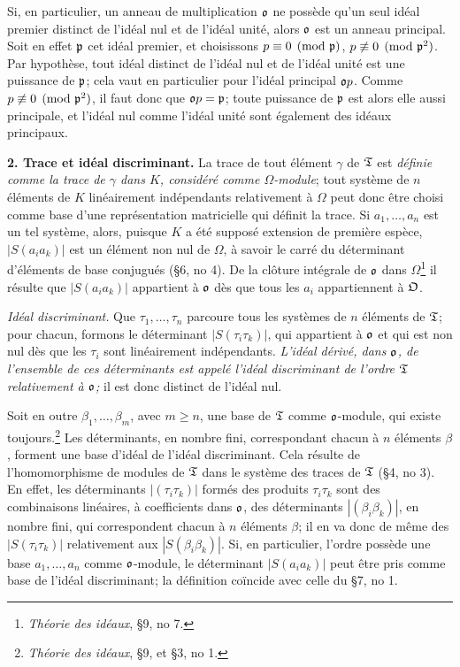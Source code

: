 Si, en particulier, un anneau de multiplication $\mathfrak o$ ne possède qu'un seul idéal premier distinct de l'idéal nul et de l'idéal unité, alors $\mathfrak o$ est un anneau principal. Soit en effet $\mathfrak p$ cet idéal premier, et choisissons $p\equiv0\pmod{\mathfrak p}$, $p\not\equiv0\pmod{\mathfrak p^2}$. Par hypothèse, tout idéal distinct de l'idéal nul et de l'idéal unité est une puissance de $\mathfrak p$; cela vaut en particulier pour l'idéal principal $\mathfrak o p$. Comme $p\not\equiv0\pmod{\mathfrak p^2}$, il faut donc que $\mathfrak o p=\mathfrak p$; toute puissance de $\mathfrak p$ est alors elle aussi principale, et l'idéal nul comme l'idéal unité sont également des idéaux principaux.

\textbf{2. Trace et idéal discriminant.} La trace de tout élément $\gamma$ de $\mathfrak T$ est \emph{définie comme la trace de $\gamma$ dans $K$, considéré comme $\Omega$-module}; tout système de $n$ éléments de $K$ linéairement indépendants relativement à $\Omega$ peut donc être choisi comme base d'une représentation matricielle qui définit la trace. Si $a_1,\ldots,a_n$ est un tel système, alors, puisque $K$ a été supposé extension de première espèce, $|S(a_i a_k)|$ est un élément non nul de $\Omega$, à savoir le carré du déterminant d'éléments de base conjugués (\S 6, no 4). De la clôture intégrale de $\mathfrak o$ dans $\Omega$\footnote{\emph{Théorie des idéaux}, \S 9, no 7.} il résulte que $|S(a_i a_k)|$ appartient à $\mathfrak o$ dès que tous les $a_i$ appartiennent à $\mathfrak O$.

\emph{Idéal discriminant.} Que $\tau_1,\ldots,\tau_n$ parcoure tous les systèmes de $n$ éléments de $\mathfrak T$; pour chacun, formons le déterminant $|S(\tau_i\tau_k)|$, qui appartient à $\mathfrak o$ et qui est non nul dès que les $\tau_i$ sont linéairement indépendants. \emph{L'idéal dérivé, dans $\mathfrak o$, de l'ensemble de ces déterminants est appelé l'idéal discriminant de l'ordre $\mathfrak T$ relativement à $\mathfrak o$;} il est donc distinct de l'idéal nul.

Soit en outre $\beta_1,\ldots,\beta_m$, avec $m\ge n$, une base de $\mathfrak T$ comme $\mathfrak o$-module, qui existe toujours.\footnote{\emph{Théorie des idéaux}, \S 9, et \S 3, no 1.} Les déterminants, en nombre fini, correspondant chacun à $n$ éléments $\beta$, forment une base d'idéal de l'idéal discriminant. Cela résulte de l'homomorphisme de modules de $\mathfrak T$ dans le système des traces de $\mathfrak T$ (\S 4, no 3). En effet, les déterminants $|(\tau_i\tau_k)|$ formés des produits $\tau_i\tau_k$ sont des combinaisons linéaires, à coefficients dans $\mathfrak o$, des déterminants $|(\beta_i\beta_k)|$, en nombre fini, qui correspondent chacun à $n$ éléments $\beta$; il en va donc de même des $|S(\tau_i\tau_k)|$ relativement aux $|S(\beta_i\beta_k)|$. Si, en particulier, l'ordre possède une base $a_1,\ldots,a_n$ comme $\mathfrak o$-module, le déterminant $|S(a_i a_k)|$ peut être pris comme base de l'idéal discriminant; la définition coïncide avec celle du \S 7, no 1.

